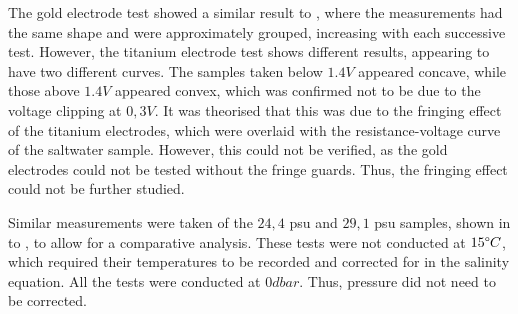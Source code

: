 The gold electrode test showed a similar result to , where the measurements had the same shape and were approximately grouped, increasing with each successive test.
However, the titanium electrode test shows different results, appearing to have two different curves.
The samples taken below $1.4V$ appeared concave, while those above $1.4V$ appeared convex, which was confirmed not to be due to the voltage clipping at $0,3V$.
It was theorised that this was due to the fringing effect of the titanium electrodes, which were overlaid with the resistance-voltage curve of the saltwater sample.
However, this could not be verified, as the gold electrodes could not be tested without the fringe guards. 
Thus, the fringing effect could not be further studied.

Similar measurements were taken of the $24,4$ \gls{psu} and $29,1$ \gls{psu} samples, shown in  to , to allow for a comparative analysis.
These tests were not conducted at $15\degree C$, which required their temperatures to be recorded and corrected for in the salinity equation.
All the tests were conducted at $0dbar$. 
Thus, pressure did not need to be corrected.

